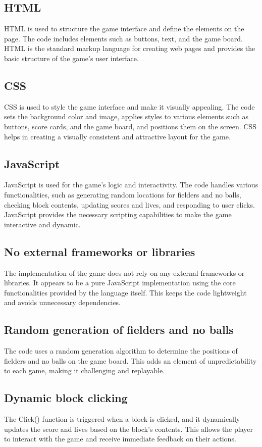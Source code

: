 \documentclass{article}
\begin{document}
\subsection*{HTML}
HTML is used to structure the game interface and define the elements on the page. The code includes elements such as buttons, text, and the game board. HTML is the standard markup language for creating web pages and provides the basic structure of the game's user interface.

\subsection*{CSS}
CSS is used to style the game interface and make it visually appealing. The code sets the background color and image, applies styles to various elements such as buttons, score cards, and the game board, and positions them on the screen. CSS helps in creating a visually consistent and attractive layout for the game.

\subsection*{JavaScript}
JavaScript is used for the game's logic and interactivity. The code handles various functionalities, such as generating random locations for fielders and no balls, checking block contents, updating scores and lives, and responding to user clicks. JavaScript provides the necessary scripting capabilities to make the game interactive and dynamic.

\subsection*{No external frameworks or libraries}
The implementation of the game does not rely on any external frameworks or libraries. It appears to be a pure JavaScript implementation using the core functionalities provided by the language itself. This keeps the code lightweight and avoids unnecessary dependencies.

\subsection*{Random generation of fielders and no balls}
The code uses a random generation algorithm to determine the positions of fielders and no balls on the game board. This adds an element of unpredictability to each game, making it challenging and replayable.

\subsection*{Dynamic block clicking}
The Click() function is triggered when a block is clicked, and it dynamically updates the score and lives based on the block's contents. This allows the player to interact with the game and receive immediate feedback on their actions.
\end{document}
